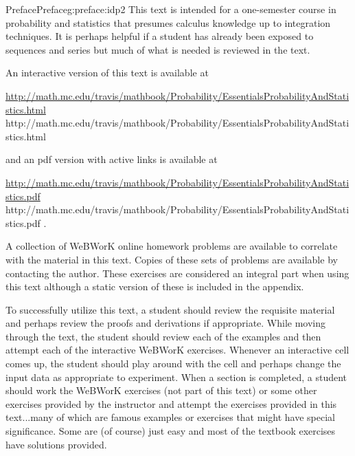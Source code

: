 \documentclass[oneside,10pt,]{book}
\numberwithin{equation}{section}
\begin{document}
\null\clearpage
%
%
\typeout{************************************************}
\typeout{************************************************}
%
\begin{preface}{Preface}{}{Preface}{}{}{g:preface:idp2}
This text is intended for a one-semester course in probability and statistics that presumes calculus knowledge up to integration techniques. It is perhaps helpful if a student has already been exposed to sequences and series but much of what is needed is reviewed in the text.%
\par
An interactive version of this text is available at%
\par
\href{http://math.mc.edu/travis/mathbook/Probability/Essentials_Probability_And_Statistics.html}{http:\slash{}\slash{}math.mc.edu\slash{}travis\slash{}mathbook\slash{}Probability\slash{}Essentials\textunderscore{}Probability\textunderscore{}And\textunderscore{}Statistics.html} http:\slash{}\slash{}math.mc.edu\slash{}travis\slash{}mathbook\slash{}Probability\slash{}Essentials\textunderscore{}Probability\textunderscore{}And\textunderscore{}Statistics.html%
\par
and an pdf version with active links is available at%
\par
\href{http://math.mc.edu/travis/mathbook/Probability/Essentials_Probability_And_Statistics.pdf}{http:\slash{}\slash{}math.mc.edu\slash{}travis\slash{}mathbook\slash{}Probability\slash{}Essentials\textunderscore{}Probability\textunderscore{}And\textunderscore{}Statistics.pdf} http:\slash{}\slash{}math.mc.edu\slash{}travis\slash{}mathbook\slash{}Probability\slash{}Essentials\textunderscore{}Probability\textunderscore{}And\textunderscore{}Statistics.pdf .%
\par
A collection of WeBWorK online homework problems are available to correlate with the material in this text. Copies of these sets of problems are available by contacting the author. These exercises are considered an integral part when using this text although a static version of these is included in the appendix.%
\par
To successfully utilize this text, a student should review the requisite material and perhaps review the proofs and derivations if appropriate. While moving through the text, the student should review each of the examples and then attempt each of the interactive WeBWorK exercises. Whenever an interactive cell comes up, the student should play around with the cell and perhaps change the input data as appropriate to experiment. When a section is completed, a student should work the WeBWorK exercises (not part of this text) or some other exercises provided by the instructor and attempt the exercises provided in this text...many of which are famous examples or exercises that might have special significance.  Some are (of course) just easy and most of the textbook exercises have solutions provided.%

\end{preface}
\end{document}
